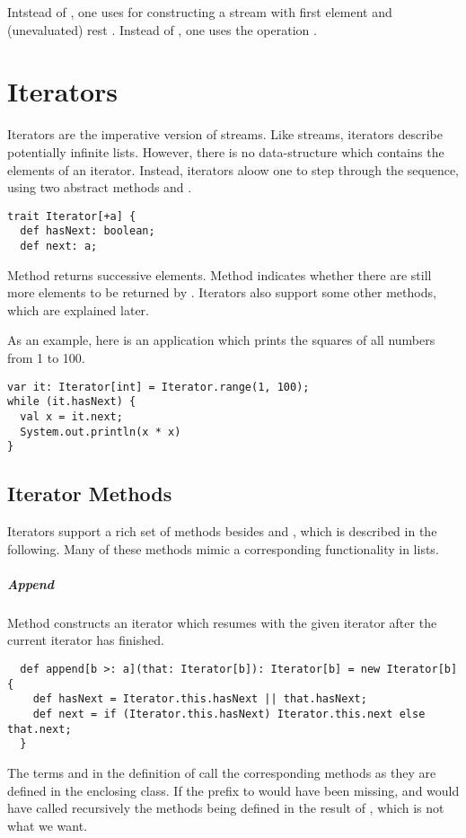 {Intstead of , one uses  for
constructing a stream with first element  and (unevaluated)
rest .  Instead of , one uses the operation
.  

\chapter{Iterators}

Iterators are the imperative version of streams. Like streams,
iterators describe potentially infinite lists. However, there is no
data-structure which contains the elements of an iterator. Instead, 
iterators aloow one to step through the sequence, using two abstract methods  and .
\begin{lstlisting}
trait Iterator[+a] {
  def hasNext: boolean;
  def next: a;
\end{lstlisting}
Method  returns successive elements.  Method 
indicates whether there are still more elements to be returned by
. Iterators also support some other methods, which are
explained later.

As an example, here is an application which prints the squares of all
numbers from 1 to 100.
\begin{lstlisting}
var it: Iterator[int] = Iterator.range(1, 100);
while (it.hasNext) {
  val x = it.next;
  System.out.println(x * x)
}
\end{lstlisting}

\section{Iterator Methods}

Iterators support a rich set of methods besides  and
, which is described in the following. Many of these
methods mimic a corresponding functionality in lists.

\paragraph{Append}
Method  constructs an iterator which resumes with the
given iterator  after the current iterator has finished.
\begin{lstlisting}
  def append[b >: a](that: Iterator[b]): Iterator[b] = new Iterator[b] {
    def hasNext = Iterator.this.hasNext || that.hasNext;
    def next = if (Iterator.this.hasNext) Iterator.this.next else that.next;
  }    
\end{lstlisting}
The terms  and 
in the definition of  call the corresponding methods as
they are defined in the enclosing  class.  If the
 prefix to  would have been missing,
 and  would have called recursively the
methods being defined in the result of , which is not
what we want.

}
